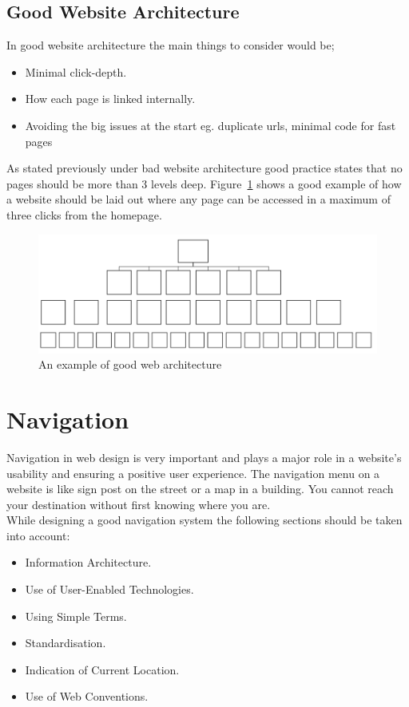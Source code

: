 \documentclass[a4paper, 12pt]{report}
\begin{document}
\subsection{Good Website Architecture}
In good website architecture the main things to consider would be;
\begin{itemize}
\item Minimal click-depth.
\item How each page is linked internally.
\item Avoiding the big issues at the start eg. duplicate urls, minimal code for fast pages 
\end{itemize}
As stated previously under bad website architecture good practice states that no pages should be more than 3 levels deep. Figure~\ref{fig:good_web_arch} shows a good example of how a website should be laid out where any page can be accessed in a maximum of three clicks from the homepage.
\begin{figure}[!htbp]
  \centering
    \includegraphics[width=1.0\textwidth]{good_web_arch.png}
    \caption{An example of good web architecture}
    \label{fig:good_web_arch}
\end{figure}

\section{Navigation}
Navigation in web design is very important and plays a major role in a website's usability and ensuring a positive user experience.   
The navigation menu on a website is like sign post on the street or a map in a building. You cannot reach your destination without first knowing where you are. \\
While designing a good navigation system the following sections should be taken into account:
\begin{itemize}
\item Information Architecture.
\item Use of User-Enabled Technologies.
\item Using Simple Terms.
\item Standardisation.
\item Indication of Current Location.
\item Use of Web Conventions.
\end{itemize}
\end{document}
